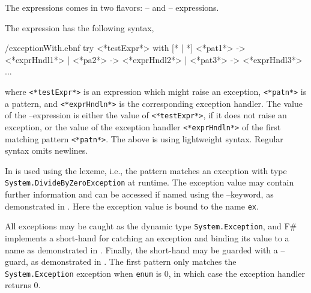 \documentclass[fsharpNotes.tex]{subfiles}
\begin{document}
The  expressions comes in two flavors: -- and -- expressions.

The  expression has the following syntax,
%
\begin{verbatimwrite}{\ebnf/exceptionWith.ebnf}
try
   <*testExpr*>
with
   [* | *] <*pat1*> -> <*exprHndl1*>
   | <*pa2*> -> <*exprHndl2*>
   | <*pat3*> -> <*exprHndl3*>
   ...
\end{verbatimwrite}
%
where \lstinline[language=syntax]{<*testExpr*>} is an expression which might raise an exception, \lstinline[language=syntax]{<*patn*>} is a pattern, and \lstinline[language=syntax]{<*exprHndln*>} is the corresponding exception handler. The value of the --expression is either the value of \lstinline[language=syntax]{<*testExpr*>}, if it does not raise an exception, or the value of the exception handler \lstinline[language=syntax]{<*exprHndln*>} of the first matching pattern \lstinline[language=syntax]{<*patn*>}. The above is using lightweight syntax. Regular syntax omits newlines.

In   is used using the  lexeme, i.e., the pattern matches an exception with type \lstinline{System.DivideByZeroException} at runtime. The exception value may contain further information and can be accessed if named using the --keyword, as demonstrated in .
%
%
Here the exception value is bound to the name \lstinline{ex}.

All exceptions may be caught as the dynamic type \lstinline{System.Exception}, and F\# implements a short-hand for catching an exception and binding its value to a name as demonstrated in .
%
%
Finally, the short-hand may be guarded with a --guard, as demonstrated in .
%
%
The first pattern only matches the \lstinline{System.Exception} exception when \lstinline{enum} is 0, in which case the exception handler returns 0.
\end{document}

